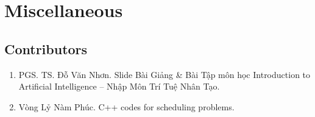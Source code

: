 \documentclass{article}
\begin{document}
\section{Miscellaneous}

\subsection{Contributors}

\begin{enumerate}
	\item PGS. TS. {\sc Đỗ Văn Nhơn}. Slide Bài Giảng \& Bài Tập môn học Introduction to Artificial Intelligence -- Nhập Môn Trí Tuệ Nhân Tạo.
	\item {\sc Vòng Lỷ Nàm Phúc.} C++ codes for scheduling problems.
\end{enumerate}


\printbibliography[heading=bibintoc]
	
\end{document}
